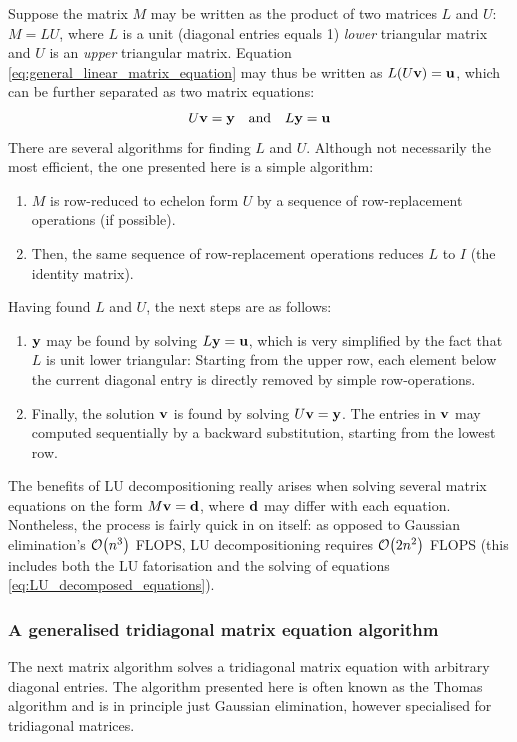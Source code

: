 \documentclass[reprint,english]{revtex4-1}
\begin{document}
Suppose the matrix \(M\) may be written as the product of two matrices \(L\) and \(U\): \(M=LU\), where \(L\) is a unit (diagonal entries equals 1) \emph{lower} triangular matrix and \(U\) is an \emph{upper} triangular matrix. Equation \eqref{eq:general_linear_matrix_equation} may thus be written as \(L(U\vb{v})=\vb{u}\), which can be further separated as two matrix equations:
\begin{equation}\label{eq:LU_decomposed_equations}
U\vb{v}=\vb{y}\qand L\vb{y}=\vb{u}
\end{equation}
There are several algorithms for finding \(L\) and \(U\). Although not necessarily the most efficient, the one presented here is a simple algorithm:
\begin{enumerate}
\item \(M\) is row-reduced to echelon form \(U\) by a sequence of row-replacement operations (if possible).
\item Then, the same sequence of row-replacement operations reduces \(L\) to \(I\) (the identity matrix).
\end{enumerate}
Having found \(L\) and \(U\), the next steps are as follows:
\begin{enumerate}
\item \(\vb{y}\) may be found by solving \(L\vb{y}=\vb{u}\), which is very simplified by the fact that \(L\) is unit lower triangular: Starting from the upper row, each element below the current diagonal entry is directly removed by simple row-operations.
\item Finally, the solution \(\vb{v}\) is found by solving \(U\vb{v}=\vb{y}\). The entries in \(\vb{v}\) may computed sequentially by a backward substitution, starting from the lowest row.
\end{enumerate}
The benefits of LU decompositioning really arises when solving several matrix equations on the form \(M\vb{v}=\vb{d}\), where \(\vb{d}\) may differ with each equation. Nontheless, the process is fairly quick in on itself: as opposed to Gaussian elimination's \(\order{n^3}\) FLOPS, LU decompositioning requires \(\order{2n^2}\) FLOPS (this includes both the LU fatorisation and the solving of equations \eqref{eq:LU_decomposed_equations}).
\newpage
\subsubsection{A generalised tridiagonal matrix equation algorithm}\label{sec:general_tridiagonal_algorithm}
The next matrix algorithm solves a tridiagonal matrix equation with arbitrary diagonal entries. The algorithm presented here is often known as the Thomas algorithm and is in principle just Gaussian elimination, however specialised for tridiagonal matrices.
\end{document}
